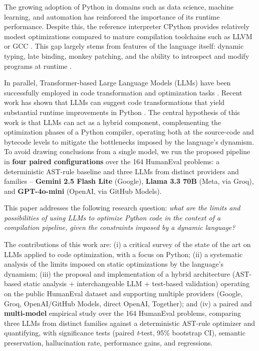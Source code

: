 \documentclass[conference]{IEEEtran}
\begin{document}
The growing adoption of Python in domains such as data science, machine learning, and automation has reinforced the importance of its runtime performance. Despite this, the reference interpreter CPython provides relatively modest optimizations compared to mature compilation toolchains such as LLVM or GCC \cite{DBLP:books/mk/CooperT11}. This gap largely stems from features of the language itself: dynamic typing, late binding, monkey patching, and the ability to introspect and modify programs at runtime \cite{DBLP:conf/pldi/RichardsLBV10}.

In parallel, Transformer-based Large Language Models (LLMs) have been successfully employed in code transformation and optimization tasks \cite{DBLP:journals/corr/abs-2309-07062,DBLP:journals/corr/abs-2407-02524,DBLP:journals/csur/AllamanisBDS18}. Recent work has shown that LLMs can suggest code transformations that yield substantial runtime improvements in Python \cite{DBLP:journals/corr/abs-2302-07867}. The central hypothesis of this work is that LLMs can act as a hybrid component, complementing the optimization phases of a Python compiler, operating both at the source-code and bytecode levels to mitigate the bottlenecks imposed by the language's dynamism. To avoid drawing conclusions from a single model, we run the proposed pipeline in \textbf{four paired configurations} over the 164 HumanEval problems: a deterministic AST-rule baseline and three LLMs from distinct providers and families -- \textbf{Gemini 2.5 Flash Lite} (Google), \textbf{Llama 3.3 70B} (Meta, via Groq), and \textbf{GPT-4o-mini} (OpenAI, via GitHub Models).

This paper addresses the following research question: \textit{what are the limits and possibilities of using LLMs to optimize Python code in the context of a compilation pipeline, given the constraints imposed by a dynamic language?}

The contributions of this work are: (i) a critical survey of the state of the art on LLMs applied to code optimization, with a focus on Python; (ii) a systematic analysis of the limits imposed on static optimizations by the language's dynamism; (iii) the proposal and implementation of a hybrid architecture (AST-based static analysis + interchangeable LLM + test-based validation) operating on the public HumanEval dataset and supporting multiple providers (Google, Groq, OpenAI/GitHub Models, direct OpenAI, Together); and (iv) a paired and \textbf{multi-model} empirical study over the 164 HumanEval problems, comparing three LLMs from distinct families against a deterministic AST-rule optimizer and quantifying, with significance tests (paired \textit{t}-test, 95\% bootstrap CI), semantic preservation, hallucination rate, performance gains, and regressions.
\end{document}
